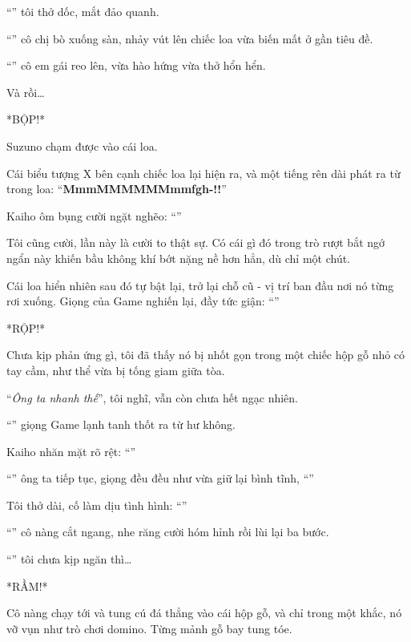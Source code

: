 \documentclass[../main.tex]{subfiles}
\begin{document}
``'' tôi thở dốc, mắt đảo quanh.

``'' cô chị bò xuống sàn, nhảy vút lên chiếc loa vừa biến mất ở gần tiêu đề.

``'' cô em gái reo lên, vừa hào hứng vừa thở hổn hển.

Và rồi\dots

*BỘP!*

Suzuno chạm được vào cái loa.

Cái biểu tượng X bên cạnh chiếc loa lại hiện ra, và một tiếng rên dài phát ra từ trong loa: ``\textbf{MmmMMMMMMmmfgh-!!}''

Kaiho ôm bụng cười ngặt nghẽo: ``''

Tôi cũng cười, lần này là cười to thật sự. Có cái gì đó trong trò rượt bắt ngớ ngẩn này khiến bầu không khí bớt nặng nề hơn hẳn, dù chỉ một chút.

Cái loa hiển nhiên sau đó tự bật lại, trở lại chỗ cũ - vị trí ban đầu nơi nó từng rơi xuống. Giọng của Game nghiến lại, đầy tức giận: ``''

*RỘP!*

Chưa kịp phản ứng gì, tôi đã thấy nó bị nhốt gọn trong một chiếc hộp gỗ nhỏ có tay cầm, như thể vừa bị tống giam giữa tòa.


``\textit{Ông ta nhanh thế}'', tôi nghĩ, vẫn còn chưa hết ngạc nhiên.

``'' giọng Game lạnh tanh thốt ra từ hư không.

Kaiho nhăn mặt rõ rệt: ``''

``'' ông ta tiếp tục, giọng đều đều như vừa giữ lại bình tĩnh, ``''

Tôi thở dài, cố làm dịu tình hình: ``''

``'' cô nàng cắt ngang, nhe răng cười hóm hỉnh rồi lùi lại ba bước.

``''  tôi chưa kịp ngăn thì\dots

*RẦM!*

Cô nàng chạy tới và tung cú đá thẳng vào cái hộp gỗ, và chỉ trong một khắc, nó vỡ vụn như trò chơi domino. Từng mảnh gỗ bay tung tóe.
\end{document}
